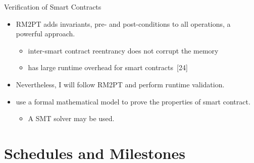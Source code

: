 \documentclass[xcolor=svgnames]{beamer}
\begin{document}
\begin{frame}{Verification of Smart Contracts}
\begin{itemize}
\item RM2PT adds invariants, pre- and post-conditions to all operations, a powerful approach.
	\begin{itemize}
	\item inter-smart contract reentrancy does not corrupt the memory
	\item has large runtime overhead for smart contracts~[24]
	\end{itemize}

\item<2-> Nevertheless, I will follow RM2PT and perform runtime validation.

\item<3-> use a formal mathematical model to prove the properties of smart contract.
	\begin{itemize}
	\item A SMT solver may be used.
	\end{itemize}
\end{itemize}

\end{frame}

\section{Schedules and Milestones}
\end{document}
